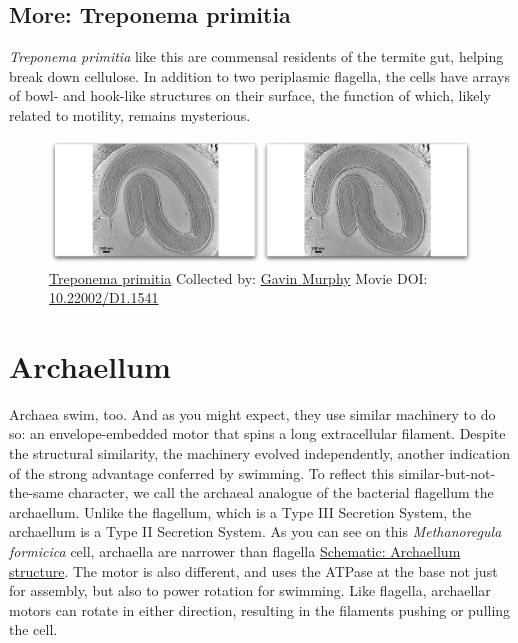 \documentclass[]{tufte-book}
\begin{document}
\hypertarget{Treponema_primitia}{\subsection*{More: Treponema
primitia}\label{Treponema_primitia}}

\emph{Treponema primitia} like this are commensal residents of the
termite gut, helping break down cellulose. In addition to two
periplasmic flagella, the cells have arrays of bowl- and hook-like
structures on their surface, the function of which, likely related to
motility, remains mysterious.





\begin{figure}
\includegraphics{movie_stills/6_7a} \caption[\protect\hyperlink{tree}{Treponema primitia} Collected by:
\protect\hyperlink{gavin_murphy}{Gavin Murphy} Movie DOI:
\href{https://doi.org/10.22002/D1.1541}{10.22002/D1.1541}]{\protect\hyperlink{tree}{Treponema primitia} Collected by:
\protect\hyperlink{gavin_murphy}{Gavin Murphy} Movie DOI:
\href{https://doi.org/10.22002/D1.1541}{10.22002/D1.1541}}\label{fig:6-7a}
\end{figure}

\section{Archaellum}\label{archaellum}

Archaea swim, too. And as you might expect, they use similar machinery
to do so: an envelope-embedded motor that spins a long extracellular
filament. Despite the structural similarity, the machinery evolved
independently, another indication of the strong advantage conferred by
swimming. To reflect this similar-but-not-the-same character, we call
the archaeal analogue of the bacterial flagellum the archaellum. Unlike
the flagellum, which is a Type III Secretion System, the archaellum is a
Type II Secretion System. As you can see on this \emph{Methanoregula
formicica} cell, archaella are narrower than flagella
\protect\hyperlink{Archaellum_structure}{Schematic: Archaellum
structure}. The motor is also different, and uses the ATPase at the base
not just for assembly, but also to power rotation for swimming. Like
flagella, archaellar motors can rotate in either direction, resulting in
the filaments pushing or pulling the cell.
\end{document}
